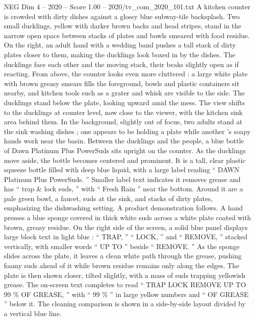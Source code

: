 \begin{textsample}{NEG Dim 4 – 2020 – Score 1.00 – 2020/tv\_com\_2020\_101.txt}  \label{ex:f4_neg_087}
A kitchen counter is crowded with dirty dishes against a glossy blue subway-tile backsplash.
Two small ducklings, yellow with darker brown backs and head stripes, stand in the narrow open space between stacks of plates and bowls smeared with food residue.
On the right, an adult hand with a wedding band pushes a tall stack of dirty plates closer to them, making the ducklings look boxed in by the dishes.
The ducklings face each other and the moving stack, their beaks slightly open as if reacting.
From above, the counter looks even more cluttered : a large white plate with brown greasy smears fills the foreground, bowls and plastic containers sit nearby, and kitchen tools such as a grater and whisk are visible to the side.
The ducklings stand below the plate, looking upward amid the mess.
The view shifts to the ducklings at counter level, now close to the viewer, with the kitchen sink area behind them.
In the background, slightly out of focus, two adults stand at the sink washing dishes ; one appears to be holding a plate while another ’s soapy hands work near the basin.
Between the ducklings and the people, a blue bottle of Dawn Platinum Plus PowerSuds sits upright on the counter.
As the ducklings move aside, the bottle becomes centered and prominent.
It is a tall, clear plastic squeeze bottle filled with deep blue liquid, with a large label reading “ DAWN Platinum Plus PowerSuds. ” Smaller label text indicates it removes grease and has “ trap \& lock suds, ” with “ Fresh Rain ” near the bottom.
Around it are a pale green bowl, a faucet, suds at the sink, and stacks of dirty plates, emphasizing the dishwashing setting.
A product demonstration follows.
A hand presses a blue sponge covered in thick white suds across a white plate coated with brown, greasy residue.
On the right side of the screen, a solid blue panel displays large block text in light blue : “ TRAP, ” “ LOCK, ” and “ REMOVE, ” stacked vertically, with smaller words “ UP TO ” beside “ REMOVE. ” As the sponge slides across the plate, it leaves a clean white path through the grease, pushing foamy suds ahead of it while brown residue remains only along the edges.
The plate is then shown closer, tilted slightly, with a mass of suds trapping yellowish grease.
The on-screen text completes to read “ TRAP LOCK REMOVE UP TO 99 \% OF GREASE, ” with “ 99 \% ” in large yellow numbers and “ OF GREASE ” below it.
The cleaning comparison is shown in a side-by-side layout divided by a vertical blue line.

\end{textsample}
